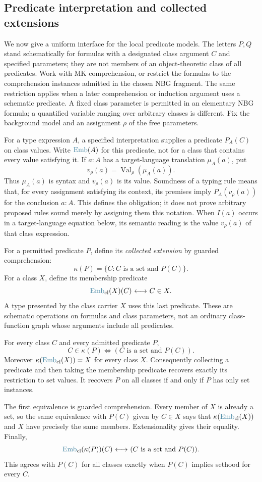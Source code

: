 \subsection{Predicate interpretation and collected extensions}
\label{sec:predicate_type_interface}
We now give a uniform interface for the local predicate models. The
letters $P,Q$ stand schematically for formulas with a designated class
argument $C$ and specified parameters; they are not members of an
object-theoretic class of all predicates. Work with MK comprehension,
or restrict the formulas to the comprehension instances admitted in
the chosen NBG fragment. The same restriction applies when a later
comprehension or induction argument uses a schematic predicate. A fixed
class parameter is permitted in an elementary NBG formula; a quantified
variable ranging over arbitrary classes is different.
Fix the background model and an assignment
$\rho$ of the free parameters.

For a type expression $A$, a specified interpretation supplies a
predicate $P_A(C)$ on class values. Write $\Emb(A)$ for this predicate,
not for a class that contains every value satisfying it. If $a:A$ has
a target-language translation $\mu_A(a)$, put
\[
v_\rho(a)=\operatorname{Val}_\rho(\mu_A(a)).
\]
Thus $\mu_A(a)$ is syntax and $v_\rho(a)$ is its value. Soundness of a
typing rule means that, for every assignment satisfying its context,
its premises imply $P_A(v_\rho(a))$ for the conclusion $a:A$.
This defines the obligation; it does not prove arbitrary proposed
rules sound merely by assigning them this notation. When $I(a)$ occurs
in a target-language equation below, its semantic reading is the value
$v_\rho(a)$ of that class expression.

For a permitted predicate $P$, define its \emph{collected extension}
by guarded comprehension:
\[
\kappa(P)=\{C:C\text{ is a set and }P(C)\}.
\]
For a class $X$, define its membership predicate
\[
\Emb_{\mathrm{cl}}(X)(C)\iff C\in X.
\]
A type presented by the class carrier $X$ uses this last predicate.
These are schematic operations on formulas and class parameters, not
an ordinary class-function graph whose arguments include all predicates.

\begin{theorem}
\label{thm:predicate_extension_projection}
For every class $C$ and every admitted predicate $P$,
\[
C\in\kappa(P)\iff(C\text{ is a set and }P(C)).
\]
Moreover $\kappa(\Emb_{\mathrm{cl}}(X))=X$ for every class $X$.
Consequently collecting a predicate and then taking the membership
predicate recovers exactly its restriction to set values. It recovers
$P$ on all classes if and only if $P$ has only set instances.
\end{theorem}
\Proof
The first equivalence is guarded comprehension. Every member of $X$
is already a set, so the same equivalence with $P(C)$ given by $C\in X$
says that $\kappa(\Emb_{\mathrm{cl}}(X))$ and $X$ have precisely the
same members. Extensionality gives their equality. Finally,
\[
\Emb_{\mathrm{cl}}(\kappa(P))(C)
\iff (C\text{ is a set and }P(C)).
\]
This agrees with $P(C)$ for all classes exactly when $P(C)$ implies
sethood for every $C$.
\Done

